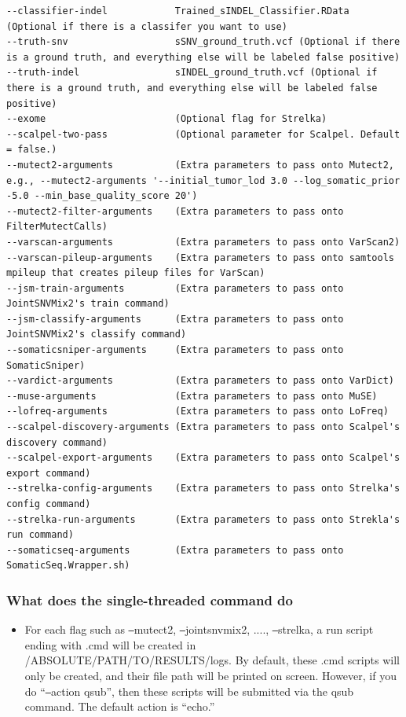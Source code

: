 \documentclass[10pt,letterpaper]{article}
\begin{document}
\begin{sloppypar}
\begin{lstlisting}
--classifier-indel            Trained_sINDEL_Classifier.RData (Optional if there is a classifer you want to use)
--truth-snv                   sSNV_ground_truth.vcf (Optional if there is a ground truth, and everything else will be labeled false positive)
--truth-indel                 sINDEL_ground_truth.vcf (Optional if there is a ground truth, and everything else will be labeled false positive)
--exome                       (Optional flag for Strelka)
--scalpel-two-pass            (Optional parameter for Scalpel. Default = false.)
--mutect2-arguments           (Extra parameters to pass onto Mutect2, e.g., --mutect2-arguments '--initial_tumor_lod 3.0 --log_somatic_prior -5.0 --min_base_quality_score 20')
--mutect2-filter-arguments    (Extra parameters to pass onto FilterMutectCalls)
--varscan-arguments           (Extra parameters to pass onto VarScan2)
--varscan-pileup-arguments    (Extra parameters to pass onto samtools mpileup that creates pileup files for VarScan)
--jsm-train-arguments         (Extra parameters to pass onto JointSNVMix2's train command)
--jsm-classify-arguments      (Extra parameters to pass onto JointSNVMix2's classify command)
--somaticsniper-arguments     (Extra parameters to pass onto SomaticSniper)
--vardict-arguments           (Extra parameters to pass onto VarDict)
--muse-arguments              (Extra parameters to pass onto MuSE)
--lofreq-arguments            (Extra parameters to pass onto LoFreq)
--scalpel-discovery-arguments (Extra parameters to pass onto Scalpel's discovery command)
--scalpel-export-arguments    (Extra parameters to pass onto Scalpel's export command)
--strelka-config-arguments    (Extra parameters to pass onto Strelka's config command)
--strelka-run-arguments       (Extra parameters to pass onto Strekla's run command)
--somaticseq-arguments        (Extra parameters to pass onto SomaticSeq.Wrapper.sh)
\end{lstlisting}



\subsubsection{What does the single-threaded command do}

\begin{itemize}
  \item
  For each flag such as \texttt{--}mutect2, \texttt{--}jointsnvmix2, ...., \texttt{--}strelka, a run script ending with .cmd will be created in /ABSOLUTE/PATH/TO/RESULTS/logs. By default, these .cmd scripts will only be created, and their file path will be printed on screen. However, if you do ``\texttt{--}action qsub'', then these scripts will be submitted via the qsub command. The default action is ``echo.''


\end{itemize}
\end{sloppypar}
\end{document}

